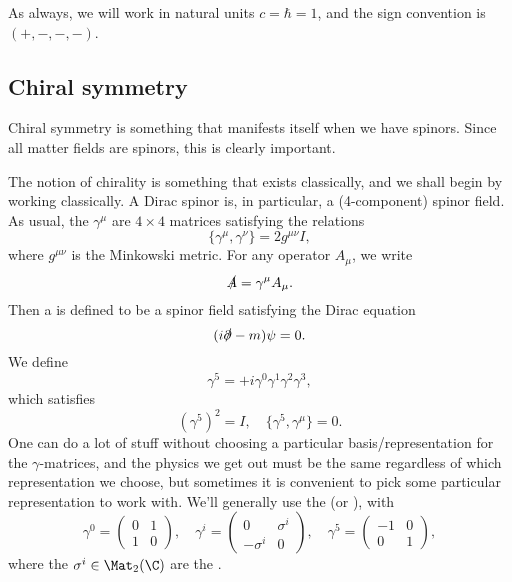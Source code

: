 \documentclass[a4paper]{article}
\begin{document}
As always, we will work in natural units $c = \hbar = 1$, and the sign convention is $(+,-,-,-)$.

\subsection{Chiral symmetry}
Chiral symmetry is something that manifests itself when we have spinors. Since all matter fields are spinors, this is clearly important.

The notion of chirality is something that exists classically, and we shall begin by working classically. A Dirac spinor is, in particular, a (4-component) spinor field. As usual, the \index{$\gamma^\mu$} $\gamma^\mu$ are $4 \times 4$ matrices satisfying the  relations
\[
  \{\gamma^\mu, \gamma^\nu\} = 2 g^{\mu\nu} I,
\]
where $g^{\mu\nu}$ is the Minkowski metric. For any operator $A_\mu$, we write
\[
  \slashed A = \gamma^\mu A_\mu.
\]
Then a  is defined to be a spinor field satisfying the Dirac equation
\[
  (i \slashed{\partial} - m) \psi = 0.
\]
We define
\[
  \gamma^5 = +i \gamma^0 \gamma^1 \gamma^2 \gamma^3,
\]
which satisfies
\[
  (\gamma^5)^2 = I,\quad \{\gamma^5, \gamma^\mu\} = 0.
\]
One can do a lot of stuff without choosing a particular basis/representation for the $\gamma$-matrices, and the physics we get out must be the same regardless of which representation we choose, but sometimes it is convenient to pick some particular representation to work with. We'll generally use the  (or ), with
\[
  \gamma^0 =
  \begin{pmatrix}
    0 & 1 \\
    1 & 0
  \end{pmatrix}, \quad
  \gamma^i =
  \begin{pmatrix}
    0 & \sigma^i\\
    -\sigma^i & 0
  \end{pmatrix},\quad
  \gamma^5 =
  \begin{pmatrix}
    -1 & 0\\
    0 & 1
  \end{pmatrix},
\]
where the $\sigma^i \in \Mat_2(\C)$ are the .
\end{document}

